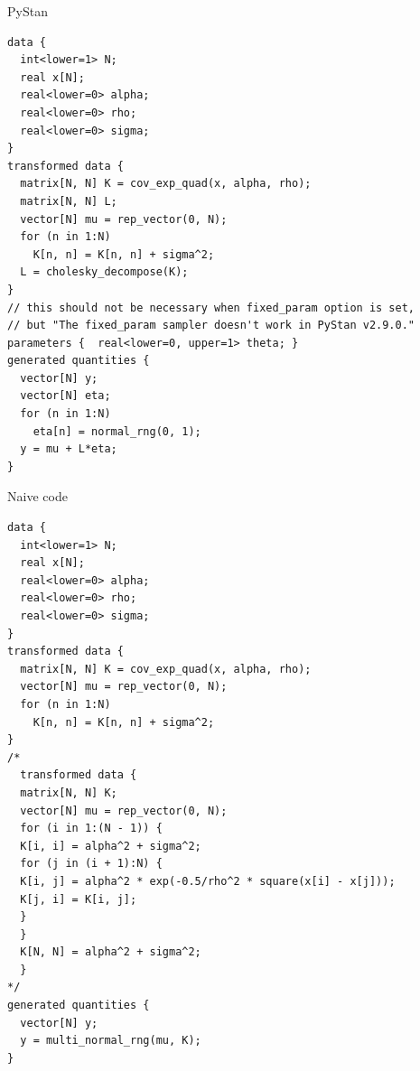 \documentclass[presentation]{beamer}
\begin{document}
\begin{frame}[fragile,label={sec:org203aeb0}]{PyStan}
 \begin{verbatim}
data {
  int<lower=1> N;
  real x[N];
  real<lower=0> alpha;
  real<lower=0> rho;
  real<lower=0> sigma;
}
transformed data {
  matrix[N, N] K = cov_exp_quad(x, alpha, rho);
  matrix[N, N] L;
  vector[N] mu = rep_vector(0, N);
  for (n in 1:N)
    K[n, n] = K[n, n] + sigma^2;
  L = cholesky_decompose(K);
}
// this should not be necessary when fixed_param option is set,
// but "The fixed_param sampler doesn't work in PyStan v2.9.0."
parameters {  real<lower=0, upper=1> theta; }
generated quantities {
  vector[N] y;
  vector[N] eta;
  for (n in 1:N)
    eta[n] = normal_rng(0, 1);
  y = mu + L*eta;
}
\end{verbatim}
\end{frame}

\begin{frame}[fragile,label={sec:org80a0b31}]{}
 \begin{block}{Naive code}
\begin{verbatim}
data {
  int<lower=1> N;
  real x[N];
  real<lower=0> alpha;
  real<lower=0> rho;
  real<lower=0> sigma;
}
transformed data {
  matrix[N, N] K = cov_exp_quad(x, alpha, rho);
  vector[N] mu = rep_vector(0, N);
  for (n in 1:N)
    K[n, n] = K[n, n] + sigma^2;
}
/*
  transformed data {
  matrix[N, N] K;
  vector[N] mu = rep_vector(0, N);
  for (i in 1:(N - 1)) {
  K[i, i] = alpha^2 + sigma^2;
  for (j in (i + 1):N) {
  K[i, j] = alpha^2 * exp(-0.5/rho^2 * square(x[i] - x[j]));
  K[j, i] = K[i, j];
  }
  }
  K[N, N] = alpha^2 + sigma^2;
  }
*/
generated quantities {
  vector[N] y;
  y = multi_normal_rng(mu, K);
}
\end{verbatim}
\end{block}
\end{frame}
\end{document}
